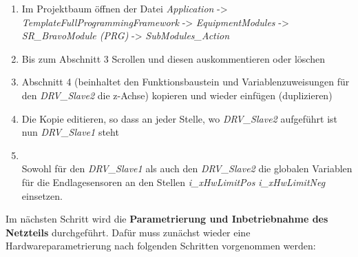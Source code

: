 \documentclass[../../../Bachelorarbeit.tex]{subfiles}
\begin{document}
\begin{enumerate}
    \item Im Projektbaum öffnen der Datei \textit{Application} -> \textit{TemplateFullProgrammingFramework} -> \textit{EquipmentModules} -> \textit{SR\_BravoModule (PRG)} -> \textit{SubModules\_Action}
    \item Bis zum Abschnitt 3 Scrollen und diesen auskommentieren oder löschen
    \item Abschnitt 4 (beinhaltet den Funktionsbaustein und Variablenzuweisungen für den \textit{DRV\_Slave2} \bzw die z-Achse) kopieren und wieder einfügen (duplizieren)
    \item Die Kopie editieren, so dass an jeder Stelle, wo \textit{DRV\_Slave2} aufgeführt ist nun \textit{DRV\_Slave1} steht
    \item \begin{minipage}[t]{\linewidth}
        \raggedright
        \label{fig:my-img37}
    \end{minipage}
    \bigskip \\
    Sowohl für den \textit{DRV\_Slave1} als auch den \textit{DRV\_Slave2} die globalen Variablen für die Endlagesensoren an den Stellen \textit{i\_xHwLimitPos} \bzw \textit{i\_xHwLimitNeg} einsetzen.
\end{enumerate}

Im nächsten Schritt wird die \textbf{Parametrierung und Inbetriebnahme des Netzteils} durchgeführt. Dafür muss zunächst wieder eine Hardwareparametrierung nach folgenden Schritten vorgenommen werden:
\end{document}
